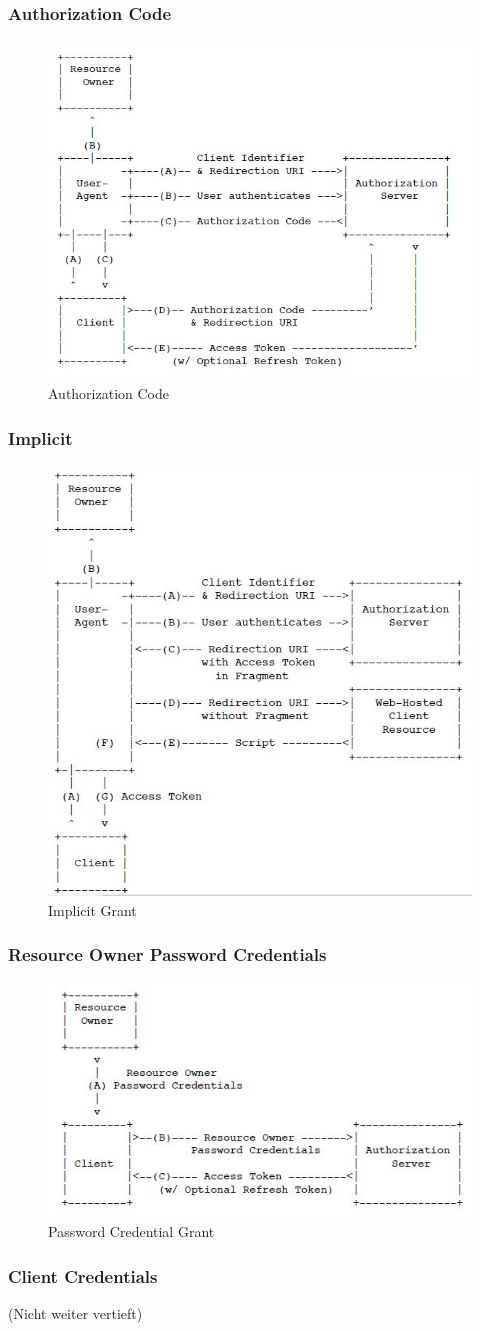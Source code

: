 \subsubsection{Authorization Code}
\begin{figure}[h!]
\centering
\includegraphics[width=0.5\linewidth]{fig/authorization-code}
\caption{Authorization Code}
\label{fig:authorization-code}
\end{figure}

\subsubsection{Implicit}
\begin{figure}[h!]
	\centering
	\includegraphics[width=0.6\linewidth]{fig/implicit-grant}
	\caption{Implicit Grant}
	\label{fig:implicit-grant}
\end{figure}

\newpage

\subsubsection{Resource Owner Password Credentials}
\begin{figure}[h!]
	\centering
	\includegraphics[width=0.7\linewidth]{fig/password-credential-grant}
	\caption{Password Credential Grant}
	\label{fig:password-credential-grant}
\end{figure}

\subsubsection{Client Credentials} 
(Nicht weiter vertieft)
